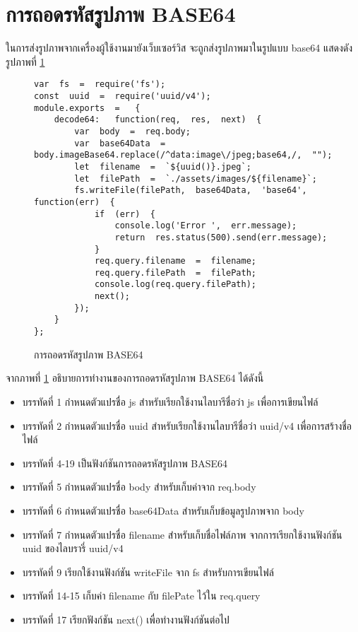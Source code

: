\section{การถอดรหัสรูปภาพ BASE64}
	ในการส่งรูปภาพจากเครื่องผู้ใช้งานมายังเว็บเซอร์วิส 
	จะถูกส่งรูปภาพมาในรูปแบบ base64 
	แสดงดังรูปภาพที่ \ref{Fig:decodeBase64}

	\begin{figure}[H]
		{\begin{lstlisting}
var  fs  =  require('fs');    
const  uuid  =  require('uuid/v4');    
module.exports  =   {        
	decode64:   function(req,  res,  next)  {            
		var  body  =  req.body;            
		var  base64Data  =  body.imageBase64.replace(/^data:image\/jpeg;base64,/,  "");            
		let  filename  =  `${uuid()}.jpeg`;            
		let  filePath  =  `./assets/images/${filename}`;            
		fs.writeFile(filePath,  base64Data,  'base64',  function(err)  {                
			if  (err)  {                    
				console.log('Error ',  err.message);                    
				return  res.status(500).send(err.message);                
			}                
			req.query.filename  =  filename;                
			req.query.filePath  =  filePath;                
			console.log(req.query.filePath);                
			next();            
		});       
	}    
};    
		\end{lstlisting}}
		\caption{การถอดรหัสรูปภาพ BASE64}
		\label{Fig:decodeBase64}
	\end{figure}
	จากภาพที่ \ref{Fig:decodeBase64} อธิบายการทำงานของการถอดรหัสรูปภาพ BASE64 ได้ดังนี้
	\begin{itemize}[label={--}]
		\item บรรทัดที่ 1	กำหนดตัวแปรชื่อ js สำหรับเรียกใช้งานไลบารีชื่อว่า js เพื่อการเขียนไฟล์
		\item บรรทัดที่ 2	กำหนดตัวแปรชื่อ uuid สำหรับเรียกใช้งานไลบารีชื่อว่า uuid/v4 เพื่อการสร้างชื่อไฟล์
		\item บรรทัดที่ 4-19	เป็นฟังก์ชันการถอดรหัสรูปภาพ BASE64
		\item บรรทัดที่ 5	กำหนดตัวแปรชื่อ body สำหรับเก็บค่าจาก req.body
		\item บรรทัดที่ 6	กำหนดตัวแปรชื่อ base64Data สำหรับเก็บข้อมูลรูปภาพจาก body 
		\item บรรทัดที่ 7	กำหนดตัวแปรชื่อ filename สำหรับเก็บชื่อไฟล์ภาพ จากการเรียกใช้งานฟังก์ชัน uuid ของไลบรารี่ uuid/v4
		\item บรรทัดที่ 9 	เรียกใช้งานฟังก์ชัน writeFile จาก fs สำหรับการเขียนไฟล์
		\item บรรทัดที่ 14-15	เก็บค่า filename กับ filePate ไว้ใน req.query
		\item บรรทัดที่ 17	เรียกฟังก์ชัน next() เพื่อทำงานฟังก์ชันต่อไป
	\end{itemize}

